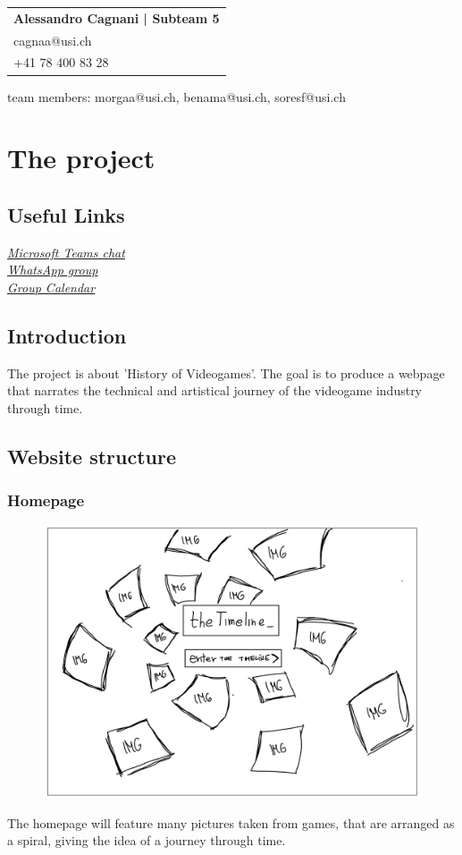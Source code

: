\documentclass[a4paper,10pt]{article}
\newcommand{\idcard}[3]{
    \vspace{-0.3cm}
    \begin{table}[h!]
     \begin{tabular}{|l|}
        \hline
        \textbf{#1} \\
        #2 \\
        #3\\
        \hline
     \end{tabular}
    \end{table}
    \vspace{-0.3cm}
}
\newcommand{\link}[2]{
    \href{#2}{\textit{\underline{#1}}}\\
}
\begin{document}
        \idcard{Alessandro Cagnani | \textbf{Subteam 5}}{cagnaa@usi.ch}{+41 78 400 83 28}
        team members: morgaa@usi.ch, benama@usi.ch, soresf@usi.ch\newline
\newpage

\section{The project}
    \subsection{Useful Links}
        \link{Microsoft Teams chat}{https://teams.microsoft.com/l/team19\%3aee0d65826e13406983df3773a93b52a2\%40thread.tacv2/conversations?groupId=675cd029-770b-4bdb-bbfc-6ea78473d809&tenantId=95bdc5ac-afb5-4881-801b-3874f365cd6f}
        \link{WhatsApp group}{https://chat.whatsapp.com/Kf9MN7y5BQ6L7svmkolKC9}
        \link{Group Calendar}{https://outlook.office.com/calendar/group/group.university/sa1g1p/view/month}
        
    \subsection{Introduction}
        The project is about 'History of Videogames'. The goal is to produce a webpage that narrates the technical and artistical journey of the videogame industry through time.
    
    \subsection{Website structure}
    \subsubsection{Homepage}        
        \begin{figure}[h]
        \includegraphics[width=.5\linewidth]{media/homepage_sketch.jpg}
        \end{figure}
        The homepage will feature many pictures taken from games, that are arranged as a spiral, giving the idea of a journey through time.
\end{document}
